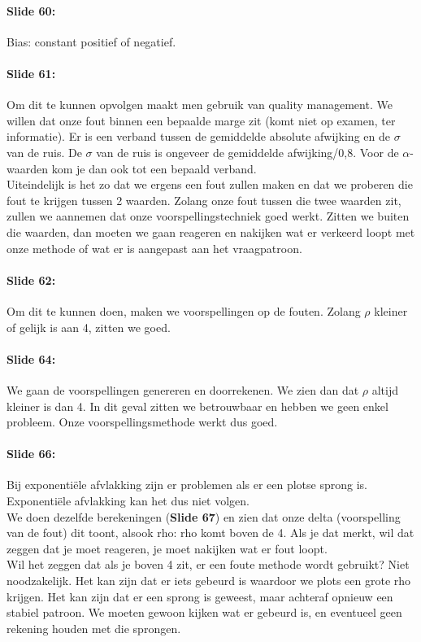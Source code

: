 \documentclass[10pt,a4paper]{report}
\begin{document}
\paragraph{Slide 60:} Bias: constant positief of negatief. 

\paragraph{Slide 61:} Om dit te kunnen opvolgen maakt men gebruik van quality management. We willen dat onze fout binnen een bepaalde marge zit (komt niet op examen, ter informatie). Er is een verband tussen de gemiddelde absolute afwijking en de $\sigma$ van de ruis. De $\sigma$ van de ruis is ongeveer de gemiddelde afwijking/0,8. Voor de $\alpha$-waarden kom je dan ook tot een bepaald verband.\\
Uiteindelijk is het zo dat we ergens een fout zullen maken en dat we proberen die fout te krijgen tussen 2 waarden. Zolang onze fout tussen die twee waarden zit, zullen we aannemen dat onze voorspellingstechniek goed werkt. Zitten we buiten die waarden, dan moeten we gaan reageren en nakijken wat er verkeerd loopt met onze methode of wat er is aangepast aan het vraagpatroon. 

\paragraph{Slide 62:} Om dit te kunnen doen, maken we voorspellingen op de fouten. Zolang $\rho$ kleiner of gelijk is aan 4, zitten we goed. 

\paragraph{Slide 64:} We gaan de voorspellingen genereren en doorrekenen. We zien dan dat $\rho$ altijd kleiner is dan 4. In dit geval zitten we betrouwbaar en hebben we geen enkel probleem. Onze voorspellingsmethode werkt dus goed.

\paragraph{Slide 66:} Bij exponenti\"ele afvlakking zijn er problemen als er een plotse sprong is. Exponenti\"ele afvlakking kan het dus niet volgen.\\
We doen dezelfde berekeningen (\textbf{Slide 67}) en zien dat onze delta (voorspelling van de fout) dit toont, alsook rho: rho komt boven de 4. Als je dat merkt, wil dat zeggen dat je moet reageren, je moet nakijken wat er fout loopt.\\
Wil het zeggen dat als je boven 4 zit, er een foute methode wordt gebruikt? Niet noodzakelijk. Het kan zijn dat er iets gebeurd is waardoor we plots een grote rho krijgen. Het kan zijn dat er een sprong is geweest, maar achteraf opnieuw een stabiel patroon. We moeten gewoon kijken wat er gebeurd is, en eventueel geen rekening houden met die sprongen. 
\end{document}

